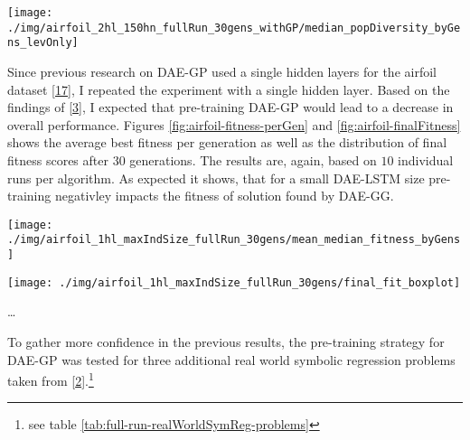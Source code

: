 \documentclass[
  11pt,
]{article}
\let\origfigure\figure
\let\endorigfigure\endfigure
\renewenvironment{figure}[1][2] {
    \expandafter\origfigure\expandafter[H]
} {
    \endorigfigure
}
\begin{document}
\begin{figure}[c]

{\centering \texttt{[image: ./img/airfoil\_2hl\_150hn\_fullRun\_30gens\_withGP/median\_popDiversity\_byGens\_levOnly]} 

}

\caption{Median Population Diversity over 30 Generations - Airfoil (2HL)}\label{fig:airfoil-popDiversity}
\end{figure}

Since previous research on DAE-GP used a single hidden layers for the airfoil dataset {[}\protect\hyperlink{ref-dae-gp_2022_symreg}{17}{]}, I repeated the experiment with a single hidden layer. Based on the findings of {[}\protect\hyperlink{ref-pmlr-v5-erhan09a}{3}{]}, I expected that pre-training DAE-GP would lead to a decrease in overall performance. Figures \ref{fig:airfoil-fitness-perGen} and \ref{fig:airfoil-finalFitness} shows the average best fitness per generation as well as the distribution of final fitness scores after 30 generations. The results are, again, based on \(10\) individual runs per algorithm. As expected it shows, that for a small DAE-LSTM size pre-training negativley impacts the fitness of solution found by DAE-GG.

\begin{figure}[c]

{\centering \texttt{[image: ./img/airfoil\_1hl\_maxIndSize\_fullRun\_30gens/mean\_median\_fitness\_byGens]} 

}

\caption{Fitness over 30 Generations - Airfoil (1HL)}\label{fig:airfoil-fitness-perGen}
\end{figure}

\begin{figure}[c]

{\centering \texttt{[image: ./img/airfoil\_1hl\_maxIndSize\_fullRun\_30gens/final\_fit\_boxplot]} 

}

\caption{Fitness after 30 Generations - Airfoil (1HL)}\label{fig:airfoil-finalFitness}
\end{figure}

\ldots{}

To gather more confidence in the previous results, the pre-training strategy for DAE-GP was tested for three additional real world symbolic regression problems taken from {[}\protect\hyperlink{ref-machine_learning_repo}{2}{]}.\footnote{see table \ref{tab:full-run-realWorldSymReg-problems}}
\end{document}
